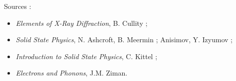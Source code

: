 \documentclass[a4paper,justified,twoside,nobib]{tufte-book}
\renewcommand{\=}[1]{\stackrel{#1}{=}} %
\begin{document}



Sources :
    \begin{itemize}
        \item \emph{Elements of X-Ray Diffraction}, B. Cullity ;
        \item \emph{Solid State Physics}, N. Ashcroft, B. Meermin ;
            Anisimov, Y. Izyumov ;
        \item \emph{Introduction to Solid State Physics}, C. Kittel ;
        \item \emph{Electrons and Phonons}, J.M. Ziman. 
    \end{itemize}
\end{document}
